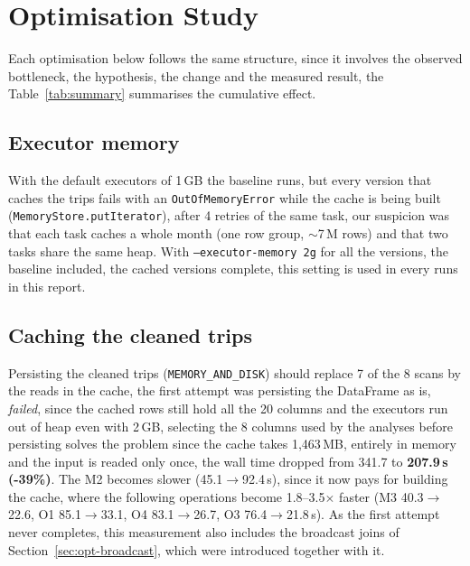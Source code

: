 \section{Optimisation Study}
\label{sec:optimisations}

Each optimisation below follows the same structure, since it involves the observed bottleneck, the hypothesis,
the change and the measured result, the Table~\ref{tab:summary} summarises the cumulative effect.

\subsection{Executor memory}
\label{sec:opt-memory}
With the default executors of 1\,GB the baseline runs, but every version that caches the trips
fails with an \texttt{OutOfMemoryError} while the cache is being built
(\texttt{MemoryStore.putIterator}), after 4 retries of the same task, our suspicion was that each
task caches a whole month (one row group, $\sim$7\,M rows) and that two tasks share the same heap.
With \texttt{--executor-memory 2g} for all the versions, the baseline included, the cached
versions complete, this setting is used in every runs in this report.


\subsection{Caching the cleaned trips}
\label{sec:opt-cache}
Persisting the cleaned trips (\texttt{MEMORY\_AND\_DISK}) should replace 7 of the 8 scans by the
reads in the cache, the first attempt was persisting the DataFrame as is, \emph{failed}, since the cached
rows still hold all the 20 columns and the executors run out of heap even with 2\,GB, selecting
the 8 columns used by the analyses before persisting solves the problem since the cache takes
1{,}463\,MB, entirely in memory and the input is readed only once, the wall time dropped from 341.7
to \textbf{207.9\,s (-39\%)}. 
The M2 becomes slower (45.1$\rightarrow$92.4\,s), since it now pays for
building the cache, where the following operations become 1.8--3.5$\times$ faster (M3
40.3$\rightarrow$22.6, O1 85.1$\rightarrow$33.1, O4 83.1$\rightarrow$26.7, O3
76.4$\rightarrow$21.8\,s). As the first attempt never completes, this measurement also includes
the broadcast joins of Section~\ref{sec:opt-broadcast}, which were introduced together with it.

